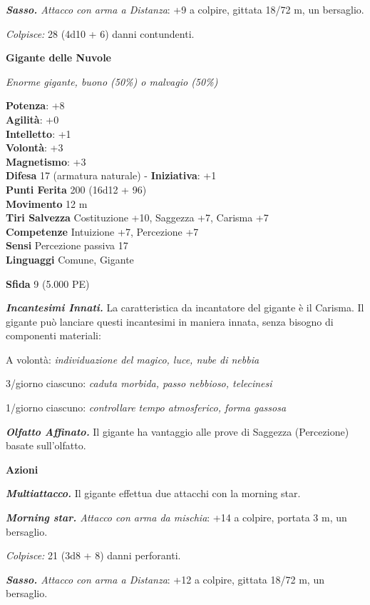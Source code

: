 \begin{multicols}{2}
\emph{\textbf{Sasso.} Attacco con arma a Distanza}: +9 a colpire,
gittata 18/72 m, un bersaglio.

\emph{Colpisce:} 28 (4d10 + 6) danni contundenti.

\medskip\textbf{Gigante delle Nuvole}

\emph{Enorme gigante, buono (50\%) o malvagio (50\%)}

\textbf{Potenza}: +8 \\
\textbf{Agilità}: +0\\
\textbf{Intelletto}: +1\\
\textbf{Volontà}: +3\\
\textbf{Magnetismo}: +3\\
\textbf{Difesa} 17 (armatura naturale) - \textbf{Iniziativa}: +1\\
\textbf{Punti Ferita} 200 (16d12 + 96)\\
\textbf{Movimento} 12 m\\
\textbf{Tiri Salvezza} Costituzione +10, Saggezza +7, Carisma +7\\
\textbf{Competenze} Intuizione +7, Percezione +7\\
\textbf{Sensi} Percezione passiva 17\\

\textbf{Linguaggi} Comune, Gigante

\textbf{Sfida} 9 (5.000 PE)

\emph{\textbf{Incantesimi Innati.}} La caratteristica da incantatore del
gigante è il Carisma. Il gigante può lanciare questi incantesimi in
maniera innata, senza bisogno di componenti materiali:

A volontà: \emph{individuazione del magico, luce, nube di nebbia}

3/giorno ciascuno: \emph{caduta morbida, passo nebbioso, telecinesi}

1/giorno ciascuno: \emph{controllare tempo atmosferico, forma gassosa}

\emph{\textbf{Olfatto Affinato.}} Il gigante ha vantaggio alle prove di
Saggezza (Percezione) basate sull'olfatto.

\textbf{Azioni}

\emph{\textbf{Multiattacco.}} Il gigante effettua due attacchi con la
morning star.

\emph{\textbf{Morning star.} Attacco con arma da mischia}: +14 a
colpire, portata 3 m, un bersaglio.

\emph{Colpisce:} 21 (3d8 + 8) danni perforanti.

\emph{\textbf{Sasso.} Attacco con arma a Distanza}: +12 a colpire,
gittata 18/72 m, un bersaglio.


\end{multicols}
